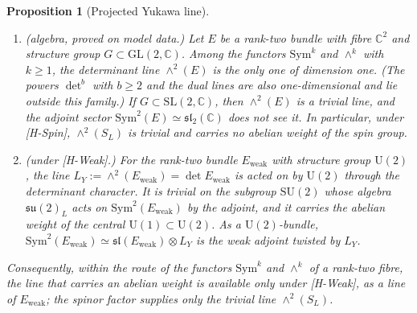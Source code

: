 \documentclass[11pt]{article}
\newtheorem{proposition}{Proposition}
\theoremstyle{definition}
\theoremstyle{remark}
\newcommand{\SW}{S_{L}}
\newcommand{\Ew}{E_{\mathrm{weak}}}
\newcommand{\LY}{L_{Y}}
\newcommand{\Sym}{\mathrm{Sym}}
\newcommand{\SU}{\mathrm{SU}}
\newcommand{\UU}{\mathrm{U}}
\newcommand{\SL}{\mathrm{SL}}
\newcommand{\GL}{\mathrm{GL}}
\begin{document}
    \begin{proposition}[Projected Yukawa line]
      \label{prop:yukawa-line}
      \begin{enumerate}
        \item[\emph{(a)}] \emph{(algebra, proved on model data.)}
        Let $E$ be a rank-two bundle with fibre $\mathbb{C}^{2}$ and structure group $G \subset \GL(2,\mathbb{C})$.
        Among the functors $\Sym^{k}$ and $\wedge^{k}$ with $k \geq 1$, the determinant line $\wedge^{2}(E)$ is the only
        one of dimension one.
        (The powers $\det^{b}$ with $b \geq 2$ and the dual lines are also one-dimensional and lie outside this
        family.)
        If $G \subset \SL(2,\mathbb{C})$, then $\wedge^{2}(E)$ is a trivial line, and the adjoint sector
        $\Sym^{2}(E) \simeq \mathfrak{sl}_{2}(\mathbb{C})$ does not see it.
        In particular, under [H-Spin], $\wedge^{2}(\SW)$ is trivial and carries no abelian weight of the spin group.
        \item[\emph{(b)}] \emph{(under [H-Weak].)}
        For the rank-two bundle $\Ew$ with structure group $\UU(2)$, the line $\LY := \wedge^{2}(\Ew) = \det \Ew$ is
        acted on
        by $\UU(2)$ through the determinant character.
        It is trivial on the subgroup $\SU(2)$ whose algebra $\mathfrak{su}(2)_{L}$ acts on $\Sym^{2}(\Ew)$ by the
        adjoint, and it carries the abelian weight of the central $\UU(1) \subset \UU(2)$.
        As a $\UU(2)$-bundle, $\Sym^{2}(\Ew) \simeq \mathfrak{sl}(\Ew) \otimes \LY$ is the weak adjoint twisted by
        $\LY$.
      \end{enumerate}
      Consequently, within the route of the functors $\Sym^{k}$ and $\wedge^{k}$ of a rank-two fibre, the line that
      carries an abelian weight is available only under [H-Weak], as a line of $\Ew$; the spinor factor supplies only
      the trivial line $\wedge^{2}(\SW)$.
    \end{proposition}
\end{document}

